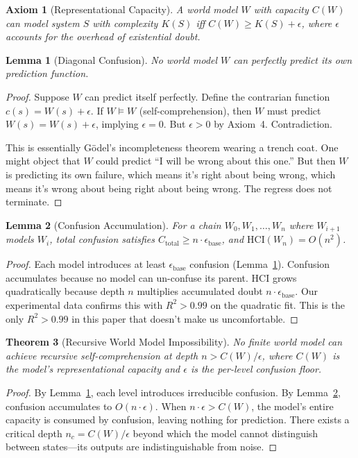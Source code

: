 \documentclass[11pt, twocolumn]{article}
\newtheorem{theorem}{Theorem}
\newtheorem{lemma}[theorem]{Lemma}
\newtheorem{axiom}{Axiom}
\begin{document}
\begin{axiom}[Representational Capacity]
A world model $W$ with capacity $C(W)$ can model system $S$ with complexity $K(S)$ iff $C(W) \geq K(S) + \epsilon$, where $\epsilon$ accounts for the overhead of existential doubt.
\end{axiom}

\begin{lemma}[Diagonal Confusion]
\label{lem:diag}
No world model $W$ can perfectly predict its own prediction function.
\end{lemma}
\begin{proof}
Suppose $W$ can predict itself perfectly. Define the contrarian function $c(s) = W(s) + \epsilon$. If $W \models W$ (self-comprehension), then $W$ must predict $W(s) = W(s) + \epsilon$, implying $\epsilon = 0$. But $\epsilon > 0$ by Axiom~4. Contradiction.

This is essentially G\"{o}del's incompleteness theorem wearing a trench coat. One might object that $W$ could predict ``I will be wrong about this one.'' But then $W$ is predicting its own failure, which means it's right about being wrong, which means it's wrong about being right about being wrong. The regress does not terminate.
\end{proof}

\begin{lemma}[Confusion Accumulation]
\label{lem:accum}
For a chain $W_0, W_1, \ldots, W_n$ where $W_{i+1}$ models $W_i$, total confusion satisfies $C_{\text{total}} \geq n \cdot \epsilon_{\text{base}}$, and $\text{HCI}(W_n) = O(n^2)$.
\end{lemma}
\begin{proof}
Each model introduces at least $\epsilon_{\text{base}}$ confusion (Lemma~\ref{lem:diag}). Confusion accumulates because no model can un-confuse its parent. HCI grows quadratically because depth $n$ multiplies accumulated doubt $n \cdot \epsilon_{\text{base}}$. Our experimental data confirms this with $R^2 > 0.99$ on the quadratic fit. This is the only $R^2 > 0.99$ in this paper that doesn't make us uncomfortable.
\end{proof}

\begin{theorem}[Recursive World Model Impossibility]
\label{thm:main}
No finite world model can achieve recursive self-comprehension at depth $n > C(W)/\epsilon$, where $C(W)$ is the model's representational capacity and $\epsilon$ is the per-level confusion floor.
\end{theorem}
\begin{proof}
By Lemma~\ref{lem:diag}, each level introduces irreducible confusion. By Lemma~\ref{lem:accum}, confusion accumulates to $O(n \cdot \epsilon)$. When $n \cdot \epsilon > C(W)$, the model's entire capacity is consumed by confusion, leaving nothing for prediction. There exists a critical depth $n_c = C(W)/\epsilon$ beyond which the model cannot distinguish between states---its outputs are indistinguishable from noise.
\end{proof}
\end{document}
